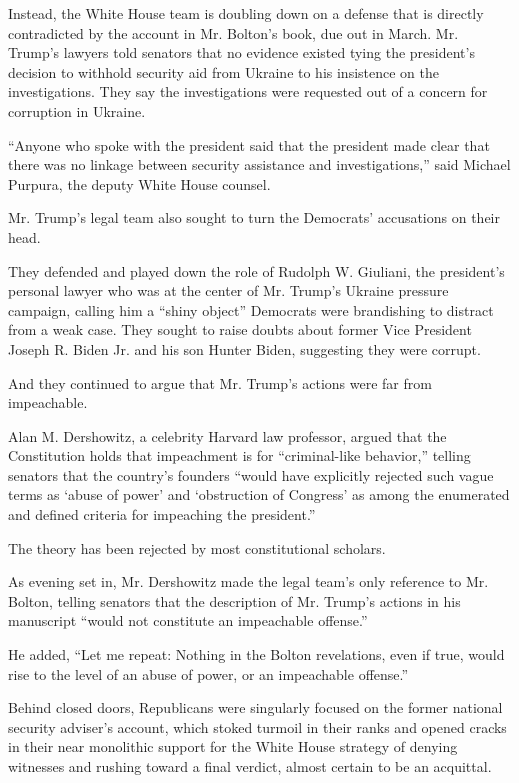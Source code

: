 Instead, the White House team is doubling down on a defense that is
directly contradicted by the account in Mr. Bolton's book, due out in
March. Mr. Trump's lawyers told senators that no evidence existed tying
the president's decision to withhold security aid from Ukraine to his
insistence on the investigations. They say the investigations were
requested out of a concern for corruption in Ukraine.

``Anyone who spoke with the president said that the president made clear
that there was no linkage between security assistance and
investigations,'' said Michael Purpura, the deputy White House counsel.

Mr. Trump's legal team also sought to turn the Democrats' accusations on
their head.

They defended and played down the role of Rudolph W. Giuliani, the
president's personal lawyer who was at the center of Mr. Trump's Ukraine
pressure campaign, calling him a ``shiny object'' Democrats were
brandishing to distract from a weak case. They sought to raise doubts
about former Vice President Joseph R. Biden Jr. and his son Hunter
Biden, suggesting they were corrupt.

And they continued to argue that Mr. Trump's actions were far from
impeachable.

Alan M. Dershowitz, a celebrity Harvard law professor, argued that the
Constitution holds that impeachment is for ``criminal-like behavior,''
telling senators that the country's founders ``would have explicitly
rejected such vague terms as `abuse of power' and `obstruction of
Congress' as among the enumerated and defined criteria for impeaching
the president.''

The theory has been rejected by most constitutional scholars.

As evening set in, Mr. Dershowitz made the legal team's only reference
to Mr. Bolton, telling senators that the description of Mr. Trump's
actions in his manuscript ``would not constitute an impeachable
offense.''

He added, ``Let me repeat: Nothing in the Bolton revelations, even if
true, would rise to the level of an abuse of power, or an impeachable
offense.''

Behind closed doors, Republicans were singularly focused on the former
national security adviser's account, which stoked turmoil in their ranks
and opened cracks in their near monolithic support for the White House
strategy of denying witnesses and rushing toward a final verdict, almost
certain to be an acquittal.

